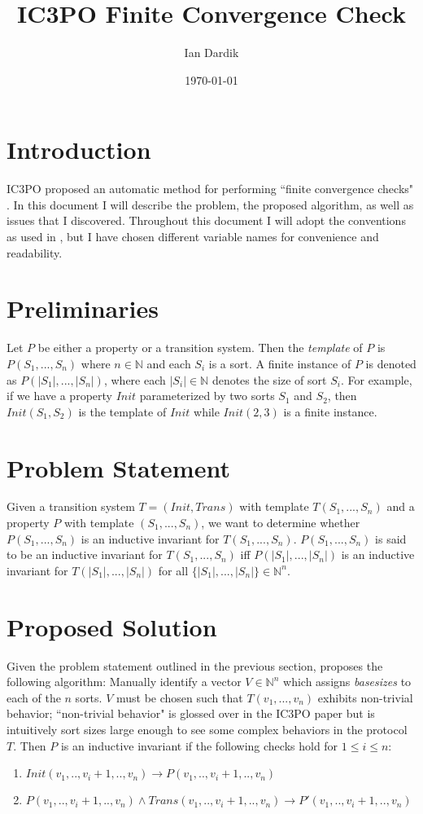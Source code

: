 \documentclass[12pt]{article}
\title{IC3PO Finite Convergence Check}
\author{Ian Dardik}
\date{\today}
\begin{document}
\maketitle

\section{Introduction}
IC3PO proposed an automatic method for performing ``finite convergence checks" \cite{goel2021symmetry}.  In this document I will describe the problem, the proposed algorithm, as well as issues that I discovered.  Throughout this document I will adopt the conventions as used in \cite{goel2021symmetry}, but I have chosen different variable names for convenience and readability.

\section{Preliminaries}
Let $P$ be either a property or a transition system.  Then the \textit{template} of $P$ is $P(S_1,...,S_n)$ where $n \in \mathbb{N}$ and each $S_i$ is a sort.  A finite instance of $P$ is denoted as $P(|S_1|,...,|S_n|)$, where each $|S_i| \in \mathbb{N}$ denotes the size of sort $S_i$.  For example, if we have a property $Init$ parameterized by two sorts $S_1$ and $S_2$, then $Init(S_1,S_2)$ is the template of $Init$ while $Init(2,3)$ is a finite instance.

\section{Problem Statement}
\label{stmt}
Given a transition system $T = (Init,Trans)$ with template $T(S_1,...,S_n)$ and a property $P$ with template $(S_1,...,S_n)$, we want to determine whether $P(S_1,...,S_n)$ is an inductive invariant for $T(S_1,...,S_n)$.  $P(S_1,...,S_n)$ is said to be an inductive invariant for $T(S_1,...,S_n)$ iff $P(|S_1|,...,|S_n|)$ is an inductive invariant for $T(|S_1|,...,|S_n|)$ for all $\{|S_1|,...,|S_n|\} \in \mathbb{N}^n$.


\section{Proposed Solution}
\label{sol}
Given the problem statement outlined in the previous section, \cite{goel2021symmetry} proposes the following algorithm: Manually identify a vector $V \in \mathbb{N}^n$ which assigns \textit{basesizes} to each of the $n$ sorts.  $V$ must be chosen such that $T(v_1,...,v_n)$ exhibits non-trivial behavior; ``non-trivial behavior" is glossed over in the IC3PO paper but is intuitively sort sizes large enough to see some complex behaviors in the protocol $T$.  Then $P$ is an inductive invariant if the following checks hold for $1 \leq i \leq n$:
\begin{enumerate}
  \item $Init(v_1,..,v_i+1,..,v_n) \rightarrow P(v_1,..,v_i+1,..,v_n)$
  \item $P(v_1,..,v_i+1,..,v_n) \land Trans(v_1,..,v_i+1,..,v_n) \rightarrow P'(v_1,..,v_i+1,..,v_n)$
\end{enumerate}
\end{document}
